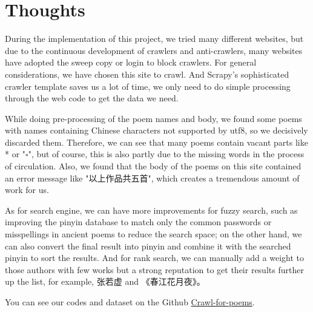 \section{Thoughts} \label{sec:concl}
During the implementation of this project, we tried many different websites, but due to the continuous development of crawlers and anti-crawlers, many websites have adopted the sweep copy or login to block crawlers. For general considerations, we have chosen this site to crawl. And Scrapy's sophisticated crawler template saves us a lot of time, we only need to do simple processing through the web code to get the data we need. 

While doing pre-processing of the poem names and body, we found some poems with names containing Chinese characters not supported by utf8, so we decisively discarded them. Therefore, we can see that many poems contain vacant parts like * or "$\square$", but of course, this is also partly due to the missing words in the process of circulation. Also, we found that the body of the poems on this site contained an error message like "以上作品共五首", which creates a tremendous amount of work for us.

As for search engine, we can have more improvements for fuzzy search, such as improving the pinyin database to match only the common passwords or misspellings in ancient poems to reduce the search space; on the other hand, we can also convert the final result into pinyin and combine it with the searched pinyin to sort the results. And for rank search, we can manually add a weight to those authors with few works but a strong reputation to get their results further up the list, for example, 张若虚 and 《春江花月夜》。



You can see our codes and dataset on the Github \href{https://github.com/yashen32768/Crawl-for-poems}{Crawl-for-poems}.